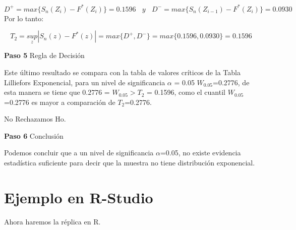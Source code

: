 \documentclass[a4paper,oneside,openany]{book}
\begin{document}
\[ D^+= max \{ S_{n}(Z_{i})-F^*(Z_{i})\}= 0.1596 \ \ \ \ y\ \ \ \ D^-= max \{ S_{n}(Z_{i-1})-F^*(Z_{i})\}=0.0930 \]
Por lo tanto:

\[T_{2}=\underset{z}{sup}|S_{n}(z)-F^*(z)|=max\{ D^+,D^-\}=max\{ 0.1596,0.0930\}=0.1596 \]

\textbf{Paso 5} Regla de Decisión

Este último resultado se compara con la tabla de valores críticos de la
Tabla Lilliefors Exponencial, para un nivel de significancia \(\alpha\)
= 0.05 \(W_{0.05}\)=0.2776, de esta manera se tiene que 0.2776 =
\(W_{0.05} > T_{2}\) = 0.1596, como el cuantil \(W_{0.05}\)=0.2776 es
mayor a comparación de \(T_{2}\)=0.2776.

No Rechazamos Ho.

\textbf{Paso 6} Conclusión

Podemos concluir que a un nivel de significancia \(\alpha\)=0.05, no
existe evidencia estadística suficiente para decir que la muestra no
tiene distribución exponencial.

\section{Ejemplo en R-Studio}\label{ejemplo-en-r-studio-16}

Ahora haremos la réplica en R.
\end{document}
